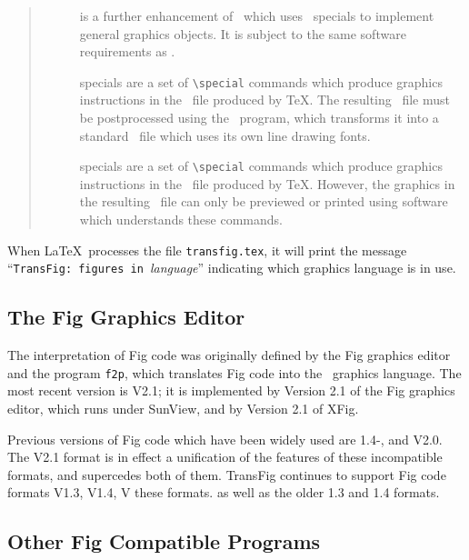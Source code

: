 \begin{quote}
\begin{description}
\item[\EEPIC]
	is a further enhancement of \EPIC\ which uses \tpic\ specials
		to implement general graphics objects.
	It is subject to the same software requirements as \tpic.

\item[\textyl]
	specials are a set of \verb|\special| commands which 
		produce graphics instructions in the \DVI\ file
		produced by \TeX.
The resulting \DVI\ file must be postprocessed using the \textyl\ program,
	which transforms it into a standard \DVI\ file which uses its own 
	line drawing fonts.
	
\item[\tpic]
	specials are a set of \verb|\special| commands which 
		produce graphics instructions in the \DVI\ file
		produced by \TeX.
	However, the graphics in the resulting \DVI\ file can only be
		previewed or printed using software which understands
		these commands.

\end{description}
\end{quote}
%
When \LaTeX\ processes the file {\tt transfig.tex}, it will print the message
	 \linebreak ``{\verb|TransFig: figures in |}{\it language}''
	indicating which graphics language is in use.

\subsection{The Fig Graphics Editor}
\label{s:fig}
The interpretation of Fig code was originally defined by 
	the Fig graphics editor and the program {\tt f2p},
	which translates Fig code into the \PIC\ graphics language. 
The most recent version is V2.1; it is implemented by Version 2.1 of the
	Fig graphics editor, which runs under SunView, and by Version 2.1
	of XFig.

Previous versions of Fig code which have been widely used are 1.4-\TFX,
	and V2.0.
The V2.1 format is in effect a unification of the features of these
	incompatible formats, and supercedes both of them.
TransFig continues to support Fig code formats V1.3, V1.4, V
 these formats. as well as the older 1.3 and 1.4 formats.

\subsection{Other Fig Compatible Programs}
\label{s:pic2fig}

